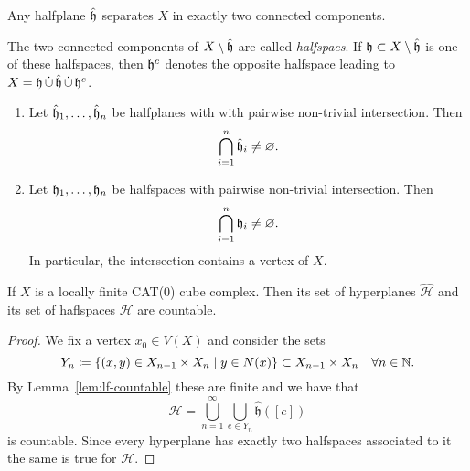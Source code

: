 \begin{thm}[Separation]
  Any halfplane \(\mathfrak{\hat h}\) separates \(X\) in exactly two connected components.
\end{thm}

\begin{defin}
  The two connected components of \(X \setminus \mathfrak{\hat h}\) are called \emph{halfspaes}. If \(\mathfrak{h} \subset X \setminus \mathfrak{\hat h}\) is one of these halfspaces, then \(\mathfrak{h}^c\) denotes the opposite halfspace leading to \(X = \mathfrak{h}\, \dot \cup\, \mathfrak{\hat h}\, \dot \cup\, \mathfrak{h}^c \).
\end{defin}

\begin{thm}[Intersection]
  \begin{enumerate}
  \item Let \(\mathfrak{\hat h}_1, \dots, \mathfrak{\hat h}_n\) be halfplanes with with pairwise non-trivial intersection. Then
    \begin{align*}
      \bigcap_{i=1}^n \mathfrak{\hat h}_i \neq \varnothing.
    \end{align*}
  \item Let \(\mathfrak{h}_1, \dots, \mathfrak{h}_n\) be halfspaces with pairwise non-trivial intersection. Then
    \begin{align*}
      \bigcap_{i=1}^n \mathfrak{h}_i \neq \varnothing.
    \end{align*}
    In particular, the intersection contains a vertex of \(X\).
  \end{enumerate}
\end{thm}

\begin{cor}
  If \(X\) is a locally finite CAT(0) cube complex. Then its set of hyperplanes \(\mathcal{\hat H}\) and its set of haflspaces \(\mathcal{H}\) are countable.
\end{cor}

\begin{proof}
  We fix a vertex \(x_0 \in V(X)\) and consider the sets
  \[
    Y_n \coloneqq \{(x,y) \in X_{n-1} \times X_{n} \mid y \in N(x)\} \subset X_{n-1} \times X_n \quad \forall n \in \mathbb{N}.
  \]
  By Lemma~\ref{lem:lf-countable} these are finite and we have that
  \[
    \mathcal{\hat H} = \bigcup_{n=1}^\infty \bigcup_{e \in Y_n} \mathfrak{\hat h}([e])
  \]
  is countable. Since every hyperplane has exactly two halfspaces associated to it the same is true for \(\mathcal{H}\).
\end{proof}

